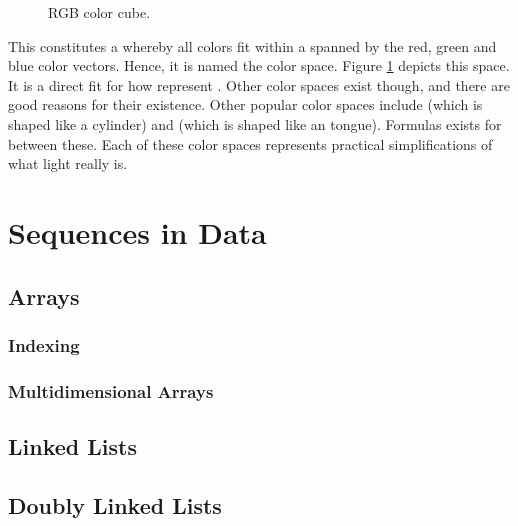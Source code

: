 \begin{figure}[tbp]
  
  \caption{RGB color cube.}
  \label{fig:primdata:struct:color}
\end{figure}

This constitutes a  whereby all colors fit within a  spanned by the red, green and blue color vectors. Hence, it is named the  color space. Figure \ref{fig:primdata:struct:color} depicts this space. It is a direct fit for how  represent . Other color spaces exist though, and there are good reasons for their existence. Other popular color spaces include  (which is shaped like a cylinder) and  (which is shaped like an tongue). Formulas exists for  between these. Each of these color spaces represents practical simplifications of what light really is.

\csharpsubsection{\csharp}


\section{Sequences in Data}

\subsection{Arrays}

\subsubsection{Indexing}


\subsubsection{Multidimensional Arrays}

\subsection{Linked Lists}


\subsection{Doubly Linked Lists}


